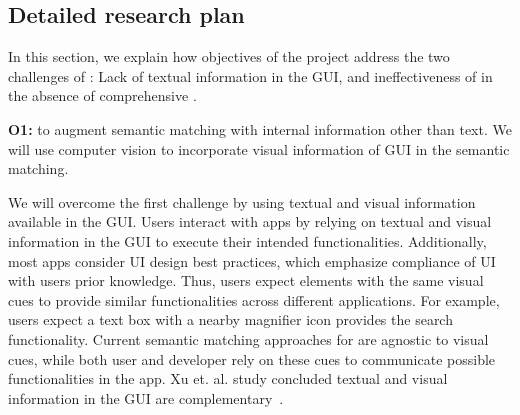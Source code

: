 \subsection{Detailed research plan}
\label{sec:detailed-plan}

In this section, we explain how objectives of the \project project address the two challenges of \testreuse: Lack of textual information in the GUI, and ineffectiveness of  \selector in the absence of comprehensive \tam. 


\bigskip 
\noindent
\textbf{O1:} 
to augment semantic matching with internal information other than text.  
We will use computer vision to incorporate visual information of GUI in the semantic matching.  

\smallskip
We will overcome the first challenge by using  textual and visual information available in the GUI.
Users interact with apps by relying on  textual and visual information in the GUI to execute their intended functionalities. 
Additionally, most apps consider UI design best practices, which emphasize compliance of UI with users prior knowledge.  
Thus, users expect elements with the same visual cues to provide similar functionalities across different applications.
For example, users expect a text box with a nearby magnifier icon provides the search functionality.
Current semantic matching approaches for \testreuse are agnostic to visual cues, while both user and developer rely on these cues to communicate possible functionalities in the app. 
Xu et. al.  study concluded textual and visual information in the GUI are complementary~\cite{Xu:GUIDER:ISSTA:2021}.




